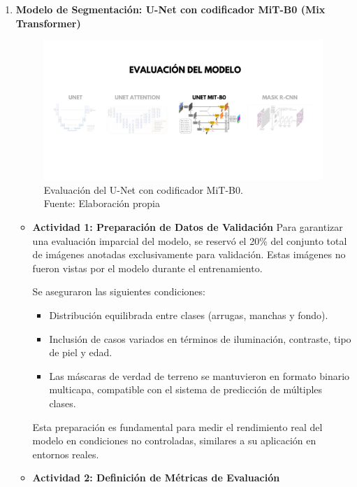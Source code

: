 \begin{enumerate}
  \newpage
  \item \textbf{Modelo de Segmentación: U-Net con codificador MiT-B0 (Mix Transformer)}
  \begin{figure}[H]
	\begin{center}
		\includegraphics[width=1\textwidth]{4/figures/evunetmit.png}
		\caption[Evaluación del U-Net con codificador MiT-B0]{Evaluación del U-Net con codificador MiT-B0.\\
		Fuente: Elaboración propia}
		\label{4:figevunetmit}
	\end{center}
\end{figure}
  \begin{itemize}
  \item\textbf{Actividad 1: Preparación de Datos de Validación}
  Para garantizar una evaluación imparcial del modelo, se reservó el 20\% del conjunto total de imágenes anotadas exclusivamente para validación. Estas imágenes no fueron vistas por el modelo durante el entrenamiento.

Se aseguraron las siguientes condiciones:
\begin{itemize}
\item Distribución equilibrada entre clases (arrugas, manchas y fondo).
\item Inclusión de casos variados en términos de iluminación, contraste, tipo de piel y edad.
\item Las máscaras de verdad de terreno se mantuvieron en formato binario multicapa, compatible con el sistema de predicción de múltiples clases.
\end{itemize}

Esta preparación es fundamental para medir el rendimiento real del modelo en condiciones no controladas, similares a su aplicación en entornos reales.
  \item\textbf{Actividad 2: Definición de Métricas de Evaluación}
  \begin{itemize}


\end{itemize}
\end{itemize}
\end{enumerate}
